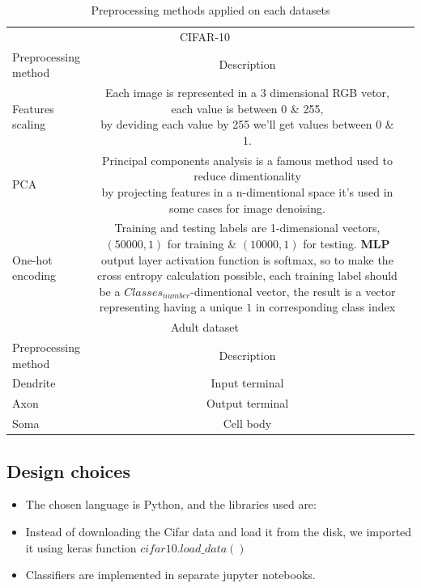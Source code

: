 \documentclass{article}
\begin{document}
\FloatBarrier
\begin{table}[!htbp]
 \centering
  \caption{Preprocessing methods applied on each datasets}
  \label{sample-table}
  
  \begin{tabular}{lcl}
  
    \toprule
    \multicolumn{2}{c}{CIFAR-10}                   \\
    \cmidrule(r){1-2}
    Preprocessing method     & Description      \\
    \midrule
    \rowcolor{Gray}
    Features scaling &   \makecell{Each image is represented in a 3 dimensional  RGB vetor, each value is between 0 \& 255,\\ by deviding each value by 255 we'll get values between 0 \& 1. }   \\
    PCA    & \makecell{Principal components analysis is a famous method used to reduce dimentionality \\by projecting features in a n-dimentional space it's used in some cases for image denoising. }   \\
     \rowcolor{Gray}
    One-hot encoding      & \makecell{Training and testing labels are 1-dimensional vectors, $\left(50000,1\right)$ for training  \& $\left(10000,1\right)$ \\for testing. \textbf{MLP} output layer activation function is softmax, so to make the\\ cross entropy calculation possible,  each training label should be \\a $Classes_{number}$-dimentional vector, the result is a vector representing\\ having a unique $1$ in corresponding class index\\  }    \\
    
     \toprule
    \multicolumn{2}{c}{Adult dataset}                   \\
    \cmidrule(r){1-2}
    Preprocessing method     & Description      \\
    \midrule
    Dendrite & Input terminal      \\
    Axon     & Output terminal    \\
    Soma     & Cell body        \\
    \bottomrule
  \end{tabular}
\end{table}
\subsection{Design choices}
\begin{itemize}
\item The chosen language is Python, and the libraries used are:
\item Instead of downloading the Cifar data and load it from the disk, we imported it using keras function $cifar10.load\_data\left(\right)$
\item Classifiers are implemented in separate jupyter notebooks.
\end{itemize}
\end{document}
